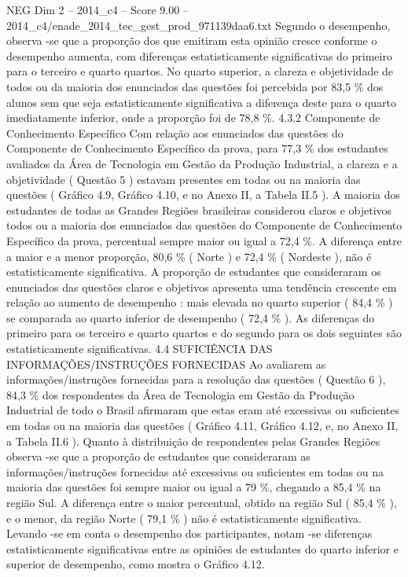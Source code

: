 \begin{textsample}{NEG Dim 2 – 2014\_c4 – Score 9.00 – 2014\_c4/enade\_2014\_tec\_gest\_prod\_971139daa6.txt}
Segundo o desempenho, observa -se que a proporção dos que emitiram esta opinião cresce conforme o desempenho aumenta, com diferenças estatisticamente significativas do primeiro para o terceiro e quarto quartos.
No quarto superior, a clareza e objetividade de todos ou da maioria dos enunciados das questões foi percebida por 83,5 \% dos alunos sem que seja estatisticamente significativa a diferença deste para o quarto imediatamente inferior, onde a proporção foi de 78,8 \%. 4.3.2 Componente de Conhecimento Específico Com relação aos enunciados das questões do Componente de Conhecimento Específico da prova, para 77,3 \% dos estudantes avaliados da Área de Tecnologia em Gestão da Produção Industrial, a clareza e a objetividade ( Questão 5 ) estavam presentes em todas ou na maioria das questões ( Gráfico 4.9, Gráfico 4.10, e no Anexo II, a Tabela II.5 ).
A maioria dos estudantes de todas as Grandes Regiões brasileiras considerou claros e objetivos todos ou a maioria dos enunciados das questões do Componente de Conhecimento Específico da prova, percentual sempre maior ou igual a 72,4 \%.
A diferença entre a maior e a menor proporção, 80,6 \% ( Norte ) e 72,4 \% ( Nordeste ), não é estatisticamente significativa.
A proporção de estudantes que consideraram os enunciados das questões claros e objetivos apresenta uma tendência crescente em relação ao aumento de desempenho : mais elevada no quarto superior ( 84,4 \% ) se comparada ao quarto inferior de desempenho ( 72,4 \% ).
As diferenças do primeiro para os terceiro e quarto quartos e do segundo para os dois seguintes são estatisticamente significativas. 4.4 SUFICIÊNCIA DAS INFORMAÇÕES/INSTRUÇÕES FORNECIDAS Ao avaliarem as informações/instruções fornecidas para a resolução das questões ( Questão 6 ), 84,3 \% dos respondentes da Área de Tecnologia em Gestão da Produção Industrial de todo o Brasil afirmaram que estas eram até excessivas ou suficientes em todas ou na maioria das questões ( Gráfico 4.11, Gráfico 4.12, e, no Anexo II, a Tabela II.6 ).
Quanto à distribuição de respondentes pelas Grandes Regiões observa -se que a proporção de estudantes que consideraram as informações/instruções fornecidas até excessivas ou suficientes em todas ou na maioria das questões foi sempre maior ou igual a 79 \%, chegando a 85,4 \% na região Sul.
A diferença entre o maior percentual, obtido na região Sul ( 85,4 \% ), e o menor, da região Norte ( 79,1 \% ) não é estatisticamente significativa.
Levando -se em conta o desempenho dos participantes, notam -se diferenças estatisticamente significativas entre as opiniões de estudantes do quarto inferior e superior de desempenho, como mostra o Gráfico 4.12.

\end{textsample}
